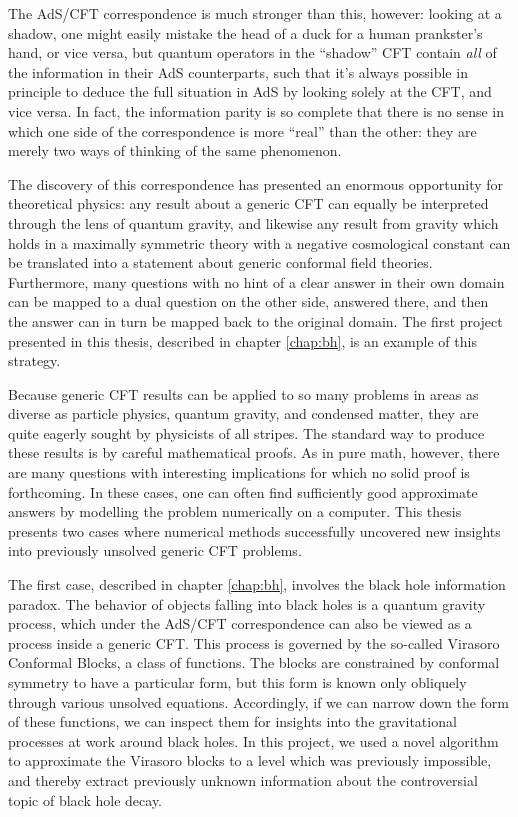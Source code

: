 The AdS/CFT correspondence is much stronger than this, however: looking at a 
shadow, one might easily mistake the head of a duck for a human prankster's 
hand, or vice versa, but quantum operators in the ``shadow'' CFT contain 
\emph{all} of the information in their AdS counterparts, such that it's always 
possible in principle to deduce the full situation in AdS by looking solely at 
the CFT, and vice versa. In fact, the information parity is so complete that 
there is no sense in which one side of the correspondence is more ``real'' than 
the other: they are merely two ways of thinking of the same phenomenon.

The discovery of this correspondence has presented an enormous opportunity for
theoretical physics: any result about a generic CFT can equally be interpreted
through the lens of quantum gravity, and likewise any result from gravity which
holds in a maximally symmetric theory with a negative cosmological constant can 
be translated into a statement about generic conformal field theories. 
Furthermore, many questions with no hint of a clear answer in their own domain 
can be mapped to a dual question on the other side, answered there, and then the 
answer can in turn be mapped back to the original domain. The first project 
presented in this thesis, described in chapter \ref{chap:bh}, is an example of 
this strategy.

Because generic CFT results can be applied to so many problems in areas as 
diverse as particle physics, quantum gravity, and condensed matter, they are 
quite eagerly sought by physicists of all stripes. The standard way to produce
these results is by careful mathematical proofs. As in pure math, however,
there are many questions with interesting implications for which no solid proof
is forthcoming. In these cases, one can often find sufficiently good approximate
answers by modelling the problem numerically on a computer. This thesis presents
two cases where numerical methods successfully uncovered new insights into 
previously unsolved generic CFT problems.

The first case, described in chapter \ref{chap:bh}, involves the black hole 
information paradox. The behavior of objects falling into black holes is a
quantum gravity process, which under the AdS/CFT correspondence can also be
viewed as a process inside a generic CFT. This process is governed by the
so-called Virasoro Conformal Blocks, a class of functions. The blocks are 
constrained by conformal symmetry to have a particular form, but this form is
known only obliquely through various unsolved equations. Accordingly, if we can
narrow down the form of these functions, we can inspect them for insights into
the gravitational processes at work around black holes. In this project, we used 
a novel algorithm to approximate the Virasoro blocks to a level which was
previously impossible, and thereby extract previously unknown information about
the controversial topic of black hole decay.

